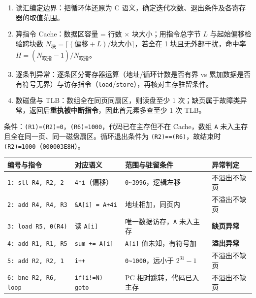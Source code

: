 \documentclass[10pt,a4paper]{ctexart}
\begin{document}

\begin{enumerate}

\item 读汇编定边界：把循环体还原为 C 语义，确定迭代次数、退出条件及各寄存器的取值范围。

\item 算指令 Cache：数据区容量 = 行数 $\times$ 块大小；用指令总字节 $L$ 与起始偏移检验跨块数 $N_{\text{块}}=\lceil(\text{偏移}+L)/\text{块大小}\rceil$，若全在 1 块且无外部干扰，命中率 $H=(N_{\text{取指}}-1)/N_{\text{取指}}$。

\item 逐条判异常：逐条区分寄存器运算（地址/循环计数是否有界 vs 累加数据是否有符号无界）与访存指令（\texttt{load}/\texttt{store}），再核对主存驻留条件。

\item 数磁盘与 TLB：数组全在同页同扇区，则读盘至少 1 次；缺页属于故障类异常，返回后\textbf{重执被中断指令}，因此首元素多查至少 1 次 TLB。

\end{enumerate}


条件：\texttt{(R1)=(R2)=0}，\texttt{(R6)=1000}，代码已在主存但不在 Cache，数组 \texttt{A} 未入主存且全在同一页、同一磁盘扇区。循环退出条件为 \texttt{(R2)==(R6)}，故结束时 \texttt{(R2)=1000}（\texttt{000003E8H}）。

\begin{center}\small
\begin{tabularx}{\linewidth}{@{}>{\raggedright\arraybackslash}X>{\raggedright\arraybackslash}X>{\raggedright\arraybackslash}X>{\raggedright\arraybackslash}X@{}}
\toprule
编号与指令 & 对应语义 & 范围与驻留条件 & 异常判定 \\
\midrule
\texttt{1: sll R4, R2, 2} & \texttt{4*i}（偏移） & \texttt{0\textasciitilde{}3996}，逻辑左移 & 不溢出不缺页 \\
\texttt{2: add R4, R4, R3} & \texttt{\&A[i] = A+4i} & 地址相加，同页内 & 不溢出不缺页 \\
\texttt{3: load R5, 0(R4)} & 读 \texttt{A[i]} & 唯一数据访存，\texttt{A} 未入主存 & \textbf{缺页异常} \\
\texttt{4: add R1, R1, R5} & \texttt{sum += A[i]} & \texttt{A[i]} 值未知，有符号加 & \textbf{溢出异常} \\
\texttt{5: add R2, R2, 1} & \texttt{i++} & \texttt{0\textasciitilde{}1000}，远小于 $2^{31}-1$ & 不溢出不缺页 \\
\texttt{6: bne R2, R6, loop} & \texttt{if(i!=N) goto} & PC 相对跳转，代码已入主存 & 不溢出不缺页 \\
\bottomrule
\end{tabularx}
\end{center}
\end{document}
